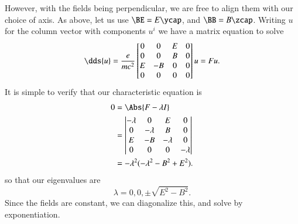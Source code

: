 {%
However, with the fields being perpendicular, we are free to align them with our choice of axis.  As above, let us use \(\BE = E \ycap\), and \(\BB = B \zcap\).  Writing \(u\) for the column vector with components \(u^i\) we have a matrix equation to solve
%
\begin{equation}\label{eqn:relElectroDynProblemSet2:530}
\dds{u} =
\frac{ e }{m c^2}
\begin{bmatrix}
0 & 0 & E & 0 \\
0 & 0 & B & 0 \\
E & -B & 0 & 0 \\
0 & 0 & 0 & 0
\end{bmatrix} u = F u.
\end{equation}
%
It is simple to verify that our characteristic equation is
%
\begin{equation}\label{eqn:relElectroDynProblemSet2:1190}
\begin{aligned}
0
&= \Abs{ F - \lambda I } \\
&= \begin{vmatrix}
-\lambda & 0 & E & 0 \\
0 & -\lambda & B & 0 \\
E & -B & -\lambda & 0 \\
0 & 0 & 0 & -\lambda
\end{vmatrix} \\
&= -\lambda^2 ( -\lambda^2 - B^2 + E^2 ).
\end{aligned}
\end{equation}
%
so that our eigenvalues are
%
\begin{equation}\label{eqn:relElectroDynProblemSet2:550}
\lambda = 0, 0, \pm \sqrt{E^2 - B^2}.
\end{equation}
%
Since the fields are constant, we can diagonalize this, and solve by exponentiation.

}

